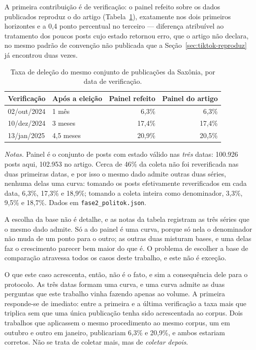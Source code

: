 A primeira contribuição é de verificação: o painel refeito sobre os dados publicados
reproduz o do artigo (Tabela~\ref{tab:tiktok-temporal}), exatamente nos dois primeiros
horizontes e a 0,4 ponto percentual no terceiro --- diferença atribuível ao tratamento
dos poucos posts cujo estado retornou erro, que o artigo não declara, no mesmo padrão de
convenção não publicada que a Seção~\ref{sec:tiktok-reproduz} já encontrou duas vezes.

\begin{table}[htbp]
\centering
\caption[Taxa de deleção, por data de verificação]{Taxa de deleção do mesmo conjunto de publicações da Saxônia, por data de
verificação.}
\label{tab:tiktok-temporal}
\begin{tabular}{llrr}
\toprule
Verificação & Após a eleição & Painel refeito & Painel do artigo \\
\midrule
02/out/2024 & 1 mês      & 6,3\%  & 6,3\%  \\
10/dez/2024 & 3 meses    & 17,4\% & 17,4\% \\
13/jan/2025 & 4,5 meses  & 20,9\% & 20,5\% \\
\bottomrule
\end{tabular}

\vspace{2pt}
{\footnotesize \textit{Notas.} Painel é o conjunto de posts com estado válido nas
\emph{três} datas: 100.926 posts aqui, 102.953 no artigo. Cerca de 46\% da coleta não
foi reverificada nas duas primeiras datas, e por isso o mesmo dado admite outras duas
séries, nenhuma delas uma curva: tomando os posts efetivamente reverificados em cada
data, 6,3\%, 17,3\% e 18,9\%; tomando a coleta inteira como denominador, 3,3\%, 9,5\% e
18,7\%. Dados em \texttt{fase2\_politok.json}.\par}
\end{table}

A escolha da base não é detalhe, e as notas da tabela registram as três séries que o
mesmo dado admite. Só a do painel é uma curva, porque só nela o denominador não muda de
um ponto para o outro; as outras duas misturam bases, e uma delas faz o crescimento
parecer bem maior do que é. O problema de escolher a base de comparação atravessa todos
os casos deste trabalho, e este não é exceção.

O que este caso acrescenta, então, não é o fato, e sim a consequência dele para o
protocolo. As três datas formam uma curva, e uma curva admite as duas perguntas que
este trabalho vinha fazendo apenas ao volume. A primeira responde-se de imediato: entre
a primeira e a última verificação a taxa mais que triplica sem que uma única publicação
tenha sido acrescentada ao corpus. Dois trabalhos que aplicassem o mesmo procedimento ao
mesmo corpus, um em outubro e outro em janeiro, publicariam 6,3\% e 20,9\%, e ambos
estariam corretos. Não se trata de coletar mais, mas de \emph{coletar depois}.

